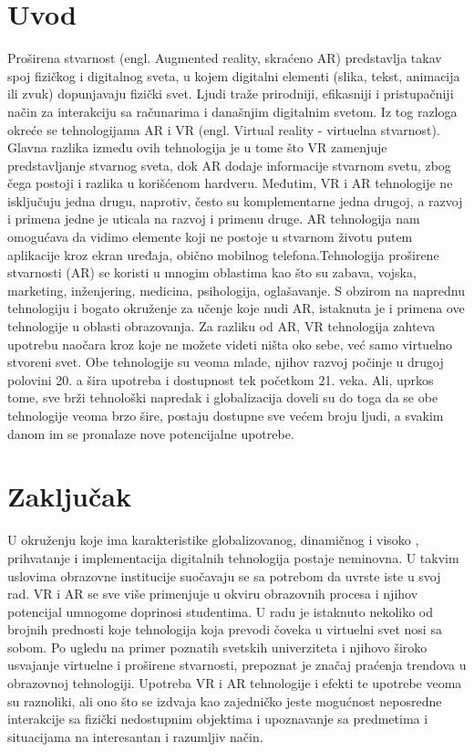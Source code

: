\documentclass[a4paper]{article}
\begin{document}
	\section{Uvod}
	\label{sec:Uvod}
	Proširena stvarnost (engl. Augmented reality, skraćeno AR) predstavlja takav spoj fizičkog i digitalnog sveta, u kojem digitalni elementi (slika, tekst, animacija ili zvuk) dopunjavaju fizički svet. Ljudi traže prirodniji, efikasniji i pristupačniji način za interakciju sa računarima i današnjim digitalnim svetom. Iz tog razloga okreće se tehnologijama AR i VR (engl. Virtual reality - virtuelna stvarnost). Glavna razlika između ovih tehnologija je u tome što VR zamenjuje predstavljanje stvarnog sveta, dok AR dodaje informacije stvarnom svetu, zbog čega postoji i razlika u korišćenom hardveru. Međutim, VR i AR tehnologije ne isključuju jedna drugu, naprotiv, često su komplementarne jedna drugoj, a razvoj i primena jedne je uticala na razvoj i primenu druge. AR tehnologija nam omogućava da vidimo elemente koji ne postoje u stvarnom životu putem aplikacije kroz ekran uređaja, obično mobilnog telefona.Tehnologija proširene stvarnosti (AR) se koristi u mnogim oblastima kao što su zabava, vojska, marketing, inženjering, medicina, psihologija, oglašavanje. S obzirom na naprednu tehnologiju i bogato okruženje za učenje koje nudi AR, istaknuta je i primena ove tehnologije u oblasti obrazovanja. Za razliku od AR, VR tehnologija zahteva upotrebu naočara kroz koje ne možete videti ništa oko sebe, već samo virtuelno stvoreni svet. Obe tehnologije su veoma mlade, njihov razvoj počinje u drugoj polovini 20. a šira upotreba i dostupnost tek početkom 21. veka. Ali, uprkos tome, sve brži tehnološki napredak i globalizacija doveli su do toga da se obe tehnologije veoma brzo šire, postaju dostupne sve većem broju ljudi, a svakim danom im se pronalaze nove potencijalne upotrebe.
	
	\section{Zaključak}
	\label{sec:Zaključak}
	U okruženju koje ima karakteristike globalizovanog, dinamičnog i visoko , prihvatanje i implementacija digitalnih tehnologija postaje neminovna. U takvim uslovima obrazovne institucije suočavaju se sa potrebom da uvrste iste u svoj rad. VR i AR se sve više primenjuje u okviru obrazovnih procesa i njihov potencijal umnogome doprinosi studentima. U radu je istaknuto nekoliko od brojnih prednosti koje tehnologija koja prevodi čoveka u virtuelni svet nosi sa sobom. Po ugledu na primer poznatih svetskih univerziteta i njihovo široko usvajanje virtuelne i proširene stvarnosti, prepoznat je značaj praćenja trendova u obrazovnoj tehnologiji. Upotreba VR i AR tehnologije i efekti te upotrebe veoma su raznoliki, ali ono što se izdvaja kao zajedničko jeste mogućnost neposredne interakcije sa fizički nedostupnim objektima i upoznavanje sa predmetima i situacijama na interesantan i razumljiv način.
\end{document}
